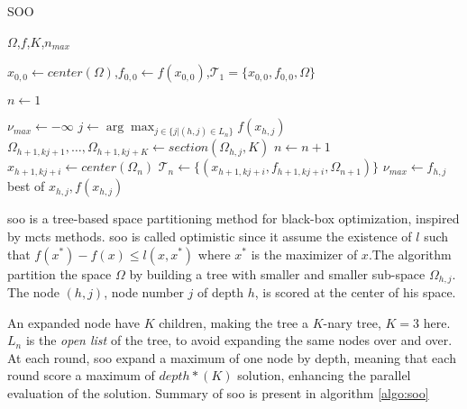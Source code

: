 \begin{algorithm}
\caption{SOO}
\label{algo:soo}
\begin{algorithmic}[1]
\Require $\Omega$,$f$,$K$,$n_{max}$ 

\State $x_{0,0} \gets center(\Omega)$,$f_{0,0} \gets    f(x_{0,0})$,$\mathcal T_1 = \{x_{0,0},f_{0,0},\Omega\}$ 

\State $n \gets 1$

    \State $\nu_{max} \gets - \infty$
        \State $j \gets \arg \max_{j \in \{j | (h,j) \in L_n\}} f(x_{h,j})$ 
            \State $\Omega_{h+1,kj+1},\dots,\Omega_{h+1,kj+K} \gets section(\Omega_{h,j},K)$ 
                \State $n \gets n+1$
                \State $x_{h+1,kj+i} \gets center(\Omega_{n})$
                \State $\mathcal T_n \gets \{(x_{h+1,kj+i},f_{h+1,kj+i},\Omega_{n+1})\}$ 
            \EndFor  
            \State $\nu_{max} \gets f_{h,j}$
        \EndIf
    \EndFor
\EndWhile\\
\Return best of $x_{h,j},f(x_{h,j})$
\end{algorithmic}
\end{algorithm}

\acrshort{soo} is a tree-based space partitioning method for black-box optimization, inspired by \acrfull{mcts} methods. \acrshort{soo} is called optimistic since it assume the existence of $ l$ such that $f(x^*)-f(x) \leq l(x,x^*)$ where $x^*$ is the maximizer of $x$.The algorithm partition the space $\Omega$ by building a tree with smaller and smaller sub-space $\Omega_{h,j}$. The node $(h,j)$, node number $j$ of depth $h$, is scored at the center of his space. 

An expanded node have $K$ children, making the tree a $K$-nary tree, $K=3$ here. $L_n$ is the \textit{open list} of the tree, to avoid expanding the same nodes over and over. At each round, \acrshort{soo} expand a maximum of one node by depth, meaning that each round score a maximum of $depth*(K)$ solution, enhancing the parallel evaluation of the solution. Summary of \acrshort{soo} is present in algorithm \ref{algo:soo}


